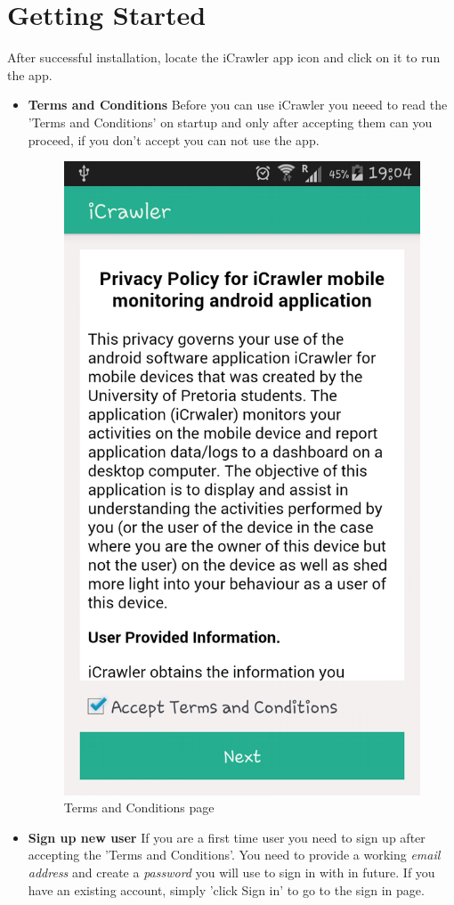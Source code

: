 \documentclass[hidelinks, 12pt, oneside]{article}
\begin{document}
	\section{Getting Started}
	After successful installation, locate the iCrawler app icon and click on it to run the app.\
	
	 \begin{itemize}
	 	\item \textbf{Terms and Conditions}\newline
	 	Before you can use iCrawler you neeed to read the 'Terms and Conditions' on startup and only 
	 	after accepting them can you proceed, if you don't accept you can not use the app.
	 	 
	 	 \begin{figure}[h!]
	 	 	\caption{Terms and Conditions page}
	 	 	\centering 																												\includegraphics[width=0.5 \textwidth]{img/tnc2.png}
	 	 \end{figure}\newpage
	 	 
	 	\item \textbf{Sign up new user}\newline
	 	If you are a first time user you need to sign up after accepting the 'Terms and Conditions'. You need
	 	to provide a working \emph{email address} and create a \emph{password} you will use to sign in with in future.
	 	If you have an existing account, simply 'click Sign in' to go to the sign in page.
	 	 

\end{itemize}
\end{document}
